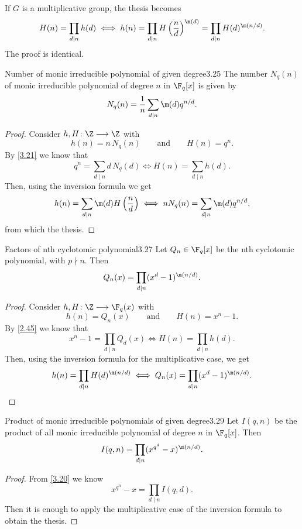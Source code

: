 \begin{oss}
	If \(G\) is a multiplicative group, the thesis becomes
	\[
		H(n) = \prod_{d \mid n}h(d) \iff h(n) = \prod_{d \mid n}H\left(\frac{n}{d}\right)^{\m(d)} = \prod_{d\mid n}H(d)^{\m(n/d)}.
	\]
	The proof is identical.
\end{oss}

\begin{teor}{Number of monic irreducible polynomial of given degree}{3.25}
	The number \(N_q(n)\) of monic irreducible polynomial of degree \(n\) in \(\F_q[x]\) is given by
	\[
		N_q(n) = \frac{1}{n}\sum_{d\mid n}\m(d)q^{n/d}.
	\]
\end{teor}

\begin{proof}
	Consider \(h,H\colon \Z \longrightarrow \Z\) with
	\[
		h(n) = n\,N_q(n) \qquad\text{and}\qquad H(n) = q^n.
	\]
	By \autoref{3.21} we know that
	\[
		q^n = \sum_{d\mid n} d\,N_q(d) \iff H(n) = \sum_{d\mid n} h(d).
	\]
	Then, using the inversion formula we get
	\[
		h(n) = \sum_{d\mid n}\m(d)H\left(\frac{n}{d}\right) \iff n N_q(n) = \sum_{d\mid n}\m(d)q^{n/d},
	\]
	from which the thesis.
\end{proof}

\begin{teor}{Factors of nth cyclotomic polynomial}{3.27}
	Let \(Q_n\in\F_q[x]\) be the nth cyclotomic polynomial, with \(p\nmid n\). Then
	\[
		Q_n(x) = \prod_{d\mid n}(x^d-1)^{\m(n/d)}.
	\]
\end{teor}

\begin{proof}
	Consider \(h,H\colon \Z \longrightarrow \F_q(x)\) with
	\[
		h(n) = Q_n(x) \qquad\text{and}\qquad H(n) = x^n-1.
	\]
	By \autoref{2.45} we know that
	\[
		x^n-1 = \prod_{d \mid n} Q_d(x) \iff H(n) = \prod_{d \mid n}h(d).
	\]
	Then, using the inversion formula for the multiplicative case, we get
	\[
		h(n) = \prod_{d\mid n} H(d)^{\m(n/d)} \iff Q_n(x) = \prod_{d \mid n} (x^d-1)^{\m(n/d)}.\qedhere
	\]
\end{proof}

\begin{teor}{Product of monic irreducible polynomials of given degree}{3.29}
	Let \(I(q,n)\) be the product of all monic irreducible polynomial of degree \(n\) in \(\F_q[x]\). Then
	\[
		I(q,n) = \prod_{d\mid n}(x^{q^d}-x)^{\m(n/d)}.
	\]
\end{teor}

\begin{proof}
	From \autoref{3.20} we know
	\[
		x^{q^n}-x = \prod_{d\mid n}I(q,d).
	\]
	Then it is enough to apply the multiplicative case of the inversion formula to obtain the thesis.
\end{proof}

